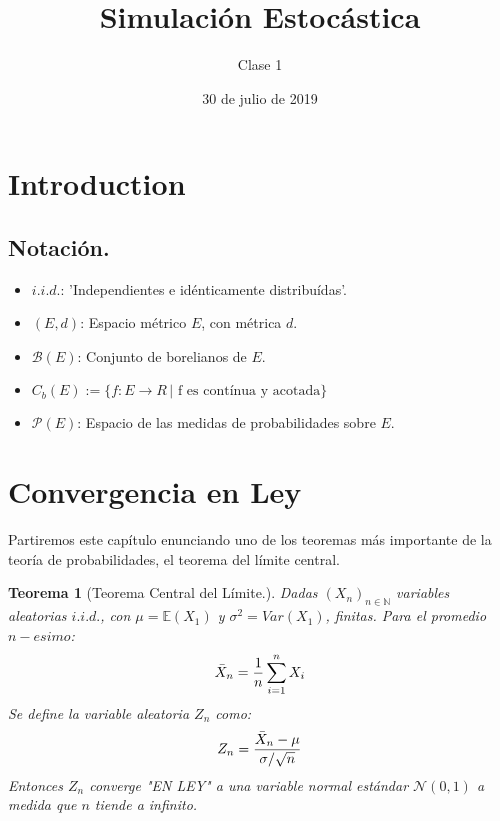 \documentclass[a4paper]{article}
\title{Simulación Estocástica}
\author{Clase 1}
\date{30 de julio de 2019}
\newtheorem{teorema}{Teorema}
\numberwithin{equation}{subsection}
\def\N{\mathbb N}
\def\E{\mathbb E}
\begin{document}
\maketitle

\section{Introduction}
\subsection{Notación.}
    \begin{itemize}
        \item $i.i.d.$: 'Independientes e idénticamente distribuídas'.
        \item $(E,d)$: Espacio métrico $E$, con métrica $d$.
        \item $\mathcal{B}(E)$: Conjunto de borelianos de $E$.
        \item $C_b (E) := \{f:E \rightarrow R \,| \text{ f es contínua y acotada}\}$
        \item $\mathcal{P}(E)$: Espacio de las medidas de probabilidades sobre $E$.
    \end{itemize}
\section{Convergencia en Ley}
Partiremos este capítulo enunciando uno de los teoremas más importante de la teoría de probabilidades, el teorema del límite central.

\begin{teorema}[Teorema Central del Límite.] Dadas $(X_n)_{n\in\N}$ variables aleatorias $i.i.d.$, con \newline$\mu = \E(X_1)$ y $\sigma^2 = Var(X_1)$, finitas. Para el promedio $n-esimo$:
\begin{equation}
    \Bar{X}_n = \frac{1}{n}\sum_{i=1}^{n}X_i
\end{equation}
Se define la variable aleatoria $Z_n$ como:
\begin{equation}
    Z_n = \frac{\Bar{X}_n - \mu}{\sigma / \sqrt{n}}
\end{equation}
Entonces $Z_n$ converge "EN LEY" a una variable normal estándar $\mathcal{N}(0,1)$ a medida que $n$ tiende a infinito.
\end{teorema}
\end{document}
